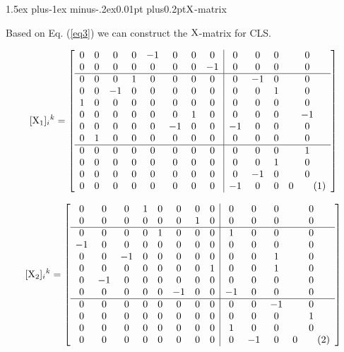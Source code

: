 \documentclass[12pt]{article}
\makeatletter
\newcommand\numberthis{\addtocounter{equation}{1}\tag{\theequation}}
\let\bm\relax
\newcommand{\bm}[1]{{\boldsymbol{#1}}}
\def\subsubsection{\@startsection{subsubsection}{3}{\z@}
          {1.5ex plus-1ex minus-.2ex}{0.01pt plus0.2pt}{\sf\boldmath}}
\makeatother
\begin{document}
\subsubsection{$\bm{\rm X}$-matrix}

Based on Eq. (\ref{eq3}) we can construct the $\bm{\rm{X}}$-matrix for CLS.

\[[{\bm{\rm X}_1}]_{i}{}^{k}= 
\left[\begin{array}{cccccccc|cccc}
 0 & 0 & 0 & 0 & -1 & 0 & 0 & 0 & 0 & 0 & 0 & 0 \\
 0 & 0 & 0 & 0 & 0 & 0 & 0 & -1 & 0 & 0 & 0 & 0 \\
  \hline
 0 & 0 & 0 & 1 & 0 & 0 & 0 & 0 & 0 & -1 & 0 & 0 \\
 0 & 0 & -1 & 0 & 0 & 0 & 0 & 0 & 0 & 0 & 1 & 0 \\
 1 & 0 & 0 & 0 & 0 & 0 & 0 & 0 & 0 & 0 & 0 & 0 \\
 0 & 0 & 0 & 0 & 0 & 0 & 1 & 0 & 0 & 0 & 0 & -1 \\
 0 & 0 & 0 & 0 & 0 & -1 & 0 & 0 & -1 & 0 & 0 & 0 \\
 0 & 1 & 0 & 0 & 0 & 0 & 0 & 0 & 0 & 0 & 0 & 0 \\
  \hline
 0 & 0 & 0 & 0 & 0 & 0 & 0 & 0 & 0 & 0 & 0 & 1 \\
 0 & 0 & 0 & 0 & 0 & 0 & 0 & 0 & 0 & 0 & 1 & 0 \\
 0 & 0 & 0 & 0 & 0 & 0 & 0 & 0 & 0 & -1 & 0 & 0 \\
 0 & 0 & 0 & 0 & 0 & 0 & 0 & 0 & -1 & 0 & 0 & 0
\numberthis\end{array}\right] \label{eq55}\]


\[[{\bm{\rm X}_2}]_{i}{}^{k}= 
\left[\begin{array}{cccccccc|cccc}
 0 & 0 & 0 & 1 & 0 & 0 & 0 & 0 & 0 & 0 & 0 & 0 \\
 0 & 0 & 0 & 0 & 0 & 0 & 1 & 0 & 0 & 0 & 0 & 0 \\
  \hline
 0 & 0 & 0 & 0 & 1 & 0 & 0 & 0 & 1 & 0 & 0 & 0 \\
 -1 & 0 & 0 & 0 & 0 & 0 & 0 & 0 & 0 & 0 & 0 & 0 \\
 0 & 0 & -1 & 0 & 0 & 0 & 0 & 0 & 0 & 0 & 1 & 0 \\
 0 & 0 & 0 & 0 & 0 & 0 & 0 & 1 & 0 & 0 & 1 & 0 \\
 0 & -1 & 0 & 0 & 0 & 0 & 0 & 0 & 0 & 0 & 0 & 0 \\
 0 & 0 & 0 & 0 & 0 & -1 & 0 & 0 & -1 & 0 & 0 & 0 \\
  \hline
 0 & 0 & 0 & 0 & 0 & 0 & 0 & 0 & 0 & 0 & -1 & 0 \\
 0 & 0 & 0 & 0 & 0 & 0 & 0 & 0 & 0 & 0 & 0 & 1 \\
 0 & 0 & 0 & 0 & 0 & 0 & 0 & 0 & 1 & 0 & 0 & 0 \\
 0 & 0 & 0 & 0 & 0 & 0 & 0 & 0 & 0 & -1 & 0 & 0
\numberthis\end{array}\right] \]
\end{document}
